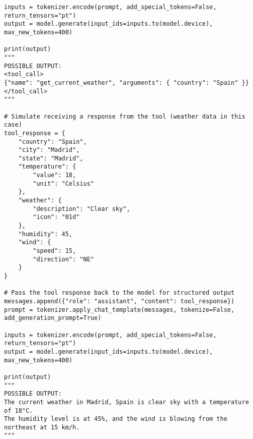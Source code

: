 \begin{verbatim}
inputs = tokenizer.encode(prompt, add_special_tokens=False, return_tensors="pt")
output = model.generate(input_ids=inputs.to(model.device), max_new_tokens=400)

print(output)
"""
POSSIBLE OUTPUT:
<tool_call>
{"name": "get_current_weather", "arguments": { "country": "Spain" }}
</tool_call>
"""

# Simulate receiving a response from the tool (weather data in this case)
tool_response = {
    "country": "Spain",
    "city": "Madrid",
    "state": "Madrid",
    "temperature": {
        "value": 18,
        "unit": "Celsius"
    },
    "weather": {
        "description": "Clear sky",
        "icon": "01d"
    },
    "humidity": 45,
    "wind": {
        "speed": 15,
        "direction": "NE"
    }
}

# Pass the tool response back to the model for structured output
messages.append({"role": "assistant", "content": tool_response})
prompt = tokenizer.apply_chat_template(messages, tokenize=False, add_generation_prompt=True)

inputs = tokenizer.encode(prompt, add_special_tokens=False, return_tensors="pt")
output = model.generate(input_ids=inputs.to(model.device), max_new_tokens=400)

print(output)
"""
POSSIBLE OUTPUT:
The current weather in Madrid, Spain is clear sky with a temperature of 18°C.
The humidity level is at 45%, and the wind is blowing from the northeast at 15 km/h.
"""
\end{verbatim}